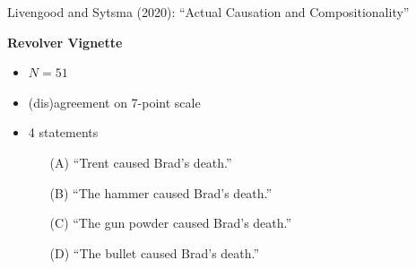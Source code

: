 \documentclass[xcolor=table,9pt,aspectratio=169]{beamer}
\begin{document}
\begin{frame}{\vspace*{10mm}Livengood and Sytsma (2020): ``Actual Causation and Compositionality''}
\vspace*{-5mm}
\begin{multicols}{2}
\textbf{Revolver Vignette}
\begin{itemize}
   \item $N=51$
   \item (dis)agreement on 7-point scale
   \item 4 statements
   \begin{itemize}
      \item[(A)] ``Trent caused Brad's death.''
      \item[(B)] ``The hammer caused Brad's death.''
      \item[(C)] ``The gun powder caused Brad's death.''
      \item[(D)] ``The bullet caused Brad's death.''
   \end{itemize}
\end{itemize}
\vfill
\begin{center}
\end{center}
\end{multicols}
\end{frame}
\end{document}
